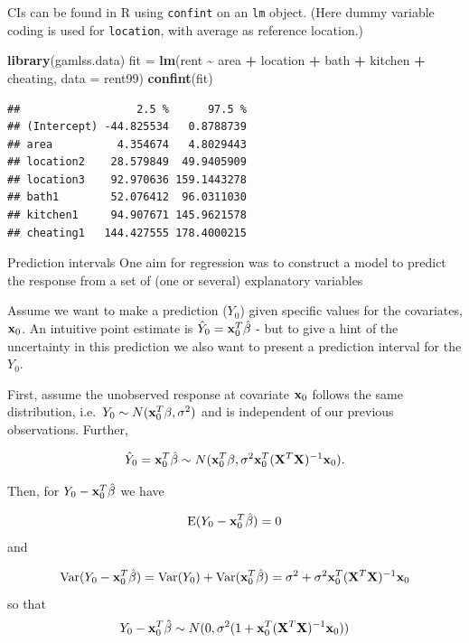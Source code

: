 \documentclass[
  ignorenonframetext,
]{beamer}
\newenvironment{Shaded}{\begin{snugshade}}{\end{snugshade}}
\newcommand{\AttributeTok}[1]{\textcolor[rgb]{0.13,0.29,0.53}{#1}}
\newcommand{\FunctionTok}[1]{\textcolor[rgb]{0.13,0.29,0.53}{\textbf{#1}}}
\newcommand{\NormalTok}[1]{#1}
\newcommand{\OtherTok}[1]{\textcolor[rgb]{0.56,0.35,0.01}{#1}}
\newcommand{\SpecialCharTok}[1]{\textcolor[rgb]{0.81,0.36,0.00}{\textbf{#1}}}
\begin{document}
\begin{frame}[fragile]
CIs can be found in R using \texttt{confint} on an \texttt{lm} object.
(Here dummy variable coding is used for \texttt{location}, with average
as reference location.)

\begin{Shaded}
\begin{Highlighting}[]
\FunctionTok{library}\NormalTok{(gamlss.data)}
\NormalTok{fit }\OtherTok{=} \FunctionTok{lm}\NormalTok{(rent }\SpecialCharTok{\textasciitilde{}}\NormalTok{ area }\SpecialCharTok{+}\NormalTok{ location }\SpecialCharTok{+}\NormalTok{ bath }\SpecialCharTok{+}\NormalTok{ kitchen }\SpecialCharTok{+}\NormalTok{ cheating, }\AttributeTok{data =}\NormalTok{ rent99)}
\FunctionTok{confint}\NormalTok{(fit)}
\end{Highlighting}
\end{Shaded}

\begin{verbatim}
##                  2.5 %      97.5 %
## (Intercept) -44.825534   0.8788739
## area          4.354674   4.8029443
## location2    28.579849  49.9405909
## location3    92.970636 159.1443278
## bath1        52.076412  96.0311030
## kitchen1     94.907671 145.9621578
## cheating1   144.427555 178.4000215
\end{verbatim}
\end{frame}

\begin{frame}
\begin{block}{Prediction intervals}
\label{prediction-intervals}
One aim for regression was to construct a model to predict the response
from a set of (one or several) explanatory variables

Assume we want to make a prediction (\(Y_0\)) given specific values for
the covariates, \({\bf x}_0\). An intuitive point estimate is
\(\hat{Y}_0={\bf x}_0^T \hat{\beta}\) - but to give a hint of the
uncertainty in this prediction we also want to present a prediction
interval for the \(Y_0\).
\end{block}
\end{frame}

\begin{frame}
First, assume the unobserved response at covariate \({\bf x}_0\) follows
the same distribution, i.e.~\(Y_0 \sim N({\bf x}_0^T \beta,\sigma^2)\)
and is independent of our previous observations. Further,

\[\hat{Y}_0={\bf x}_0^T \hat{\beta} \sim N({\bf x}_0^T \beta,\sigma^2 {\bf x}_0^T({\bf X}^T{\bf X})^{-1}{\bf x}_0).\]

Then, for \(Y_0-{\bf x}_0^T \hat{\beta}\) we have

\[\text{E}(Y_0-{\bf x}_0^T \hat{\beta})=0\] and

\[\text{Var}(Y_0-{\bf x}_0^T \hat{\beta})=\text{Var}(Y_0)+\text{Var}({\bf x}_0^T \hat{\beta})=\sigma^2+\sigma^2{\bf x}_0^T({\bf X}^T{\bf X})^{-1}{\bf x}_0\]
so that
\[Y_0-{\bf x}_0^T \hat{\beta}\sim N(0,\sigma^2 (1+{\bf x}_0^T({\bf X}^T{\bf X})^{-1}{\bf x}_0)) \]
\end{frame}
\end{document}
